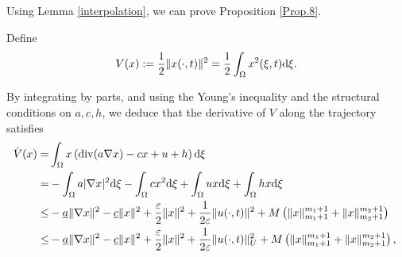 \documentclass[onecolumn]{autart}
\newenvironment{proof of Prop.ODE}{{\it Proof of Proposition~\ref{Prop.ODE}:\enspace}}{\hfill $\blacksquare$\par}
\newenvironment{proof of PDE}{{\it Proof of Proposition \ref{Prop.8}:\enspace}}{\hfill $\blacksquare$\par}
\begin{document}
{%
Using Lemma \ref{interpolation}, we can prove Proposition \ref{Prop.8}.

\begin{proof of PDE}
	Define
	\begin{align*}
		V(x):=\frac{1}{2}\|x(\cdot, t)\|^{2}=\frac{1}{2}\int_{\Omega}x^{2}(\xi, t){\rm d}\xi.
	\end{align*}
	
	By integrating by parts,  and using the Young's inequality and the structural conditions on $a,c,h$, we deduce that the derivative of $V$ along the trajectory satisfies
	\begin{align}
		\!\!{\dot{V}(x)}= &\int_{\Omega}x \left({\rm div}(a \nabla x )-c x +u +h \right){\rm d}\xi\notag\\
		\!\!=&-\int_{\Omega}a|\nabla x|^{2}{\rm d}\xi  -\int_{\Omega} c x^2 {\rm d}\xi  +\int_{\Omega}  ux{\rm d}\xi +\int_{\Omega} h x{\rm d}\xi\notag\\
		\!\!\leq &-\underline{a} \|\nabla x\|^2  -  \underline{c}   \|x\|^2 +\frac{\varepsilon}{2} \|x\|^2 +\frac{1}{2\varepsilon}   \|u(\cdot,t)\|^2 + M\left(\|x\|_{m_1+1}^{m_1+1}+ \|x\|_{m_2+1}^{m_2+1}\right)\notag\\
		\!\!\leq &-\underline{a} \|\nabla x\|^2  -  \underline{c}   \|x\|^2 +\frac{\varepsilon}{2} \|x\|^2 +\frac{1}{2\varepsilon}    {\|u(\cdot,t)\|^2_{U}} + M\left(\|x\|_{m_1+1}^{m_1+1}+ \|x\|_{m_2+1}^{m_2+1}\right),\label{16}
	\end{align}

\end{proof of PDE}}
\end{document}
